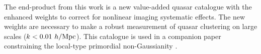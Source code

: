 The end-product from this work is a new value-added quasar catalogue with the enhanced weights to correct for nonlinear imaging systematic effects. The new weights are necessary to make a robust measurement of quasar clustering on large scales ($k < 0.01~h/{\rm Mpc}$). This catalogue is used in a companion paper constraining the local-type primordial non-Gaussianity \citep{mueller2020fnl}.


